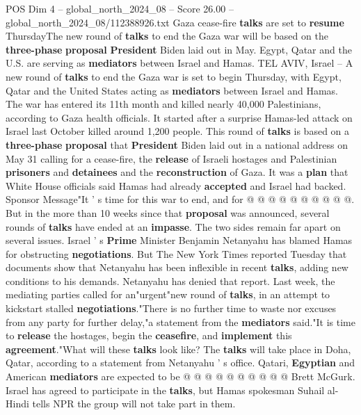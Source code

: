 \begin{textsample}{POS Dim 4 – global\_north\_2024\_08 – Score 26.00 – global\_north\_2024\_08/112388926.txt}  \label{ex:f4_pos_153}
Gaza cease-fire \textbf{talks} are set to \textbf{resume} ThursdayThe new round of \textbf{talks} to end the Gaza war will be based on the \textbf{three-phase} \textbf{proposal} \textbf{President} Biden laid out in May.
Egypt, Qatar and the U.S. are serving as \textbf{mediators} between Israel and Hamas.
TEL AVIV, Israel -- A new round of \textbf{talks} to end the Gaza war is set to begin Thursday, with Egypt, Qatar and the United States acting as \textbf{mediators} between Israel and Hamas.
The war has entered its 11th month and killed nearly 40,000 Palestinians, according to Gaza health officials.
It started after a surprise Hamas-led attack on Israel last October killed around 1,200 people.
This round of \textbf{talks} is based on a \textbf{three-phase} \textbf{proposal} that \textbf{President} Biden laid out in a national address on May 31 calling for a cease-fire, the \textbf{release} of Israeli hostages and Palestinian \textbf{prisoners} and \textbf{detainees} and the \textbf{reconstruction} of Gaza.
It was a \textbf{plan} that White House officials said Hamas had already \textbf{accepted} and Israel had backed.
Sponsor Message"It ' s time for this war to end, and for @ @ @ @ @ @ @ @ @ @.
But in the more than 10 weeks since that \textbf{proposal} was announced, several rounds of \textbf{talks} have ended at an \textbf{impasse}.
The two sides remain far apart on several issues.
Israel ' s \textbf{Prime} Minister Benjamin Netanyahu has blamed Hamas for obstructing \textbf{negotiations}.
But The New York Times reported Tuesday that documents show that Netanyahu has been inflexible in recent \textbf{talks}, adding new conditions to his demands.
Netanyahu has denied that report.
Last week, the mediating parties called for an"urgent"new round of \textbf{talks}, in an attempt to kickstart stalled \textbf{negotiations}."There is no further time to waste nor excuses from any party for further delay,"a statement from the \textbf{mediators} said."It is time to \textbf{release} the hostages, begin the \textbf{ceasefire}, and \textbf{implement} this \textbf{agreement}."What will these \textbf{talks} look like?
The \textbf{talks} will take place in Doha, Qatar, according to a statement from Netanyahu ' s office.
Qatari, \textbf{Egyptian} and American \textbf{mediators} are expected to be @ @ @ @ @ @ @ @ @ @ Brett McGurk.
Israel has agreed to participate in the \textbf{talks}, but Hamas spokesman Suhail al-Hindi tells NPR the group will not take part in them.

\end{textsample}
